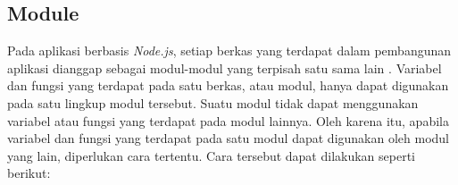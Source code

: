 %			
%			
%			
%			
%			

\subsection{Module}
Pada aplikasi berbasis \textit{Node.js}, setiap berkas yang terdapat dalam pembangunan aplikasi dianggap sebagai modul-modul yang terpisah satu sama lain \cite{dahl:09:nodejsdocs}. Variabel dan fungsi yang terdapat pada satu berkas, atau modul, hanya dapat digunakan pada satu lingkup modul tersebut. Suatu modul tidak dapat menggunakan variabel atau fungsi yang terdapat pada modul lainnya. Oleh karena itu, apabila variabel dan fungsi yang terdapat pada satu modul dapat digunakan oleh modul yang lain, diperlukan cara tertentu. Cara tersebut dapat dilakukan seperti berikut:

